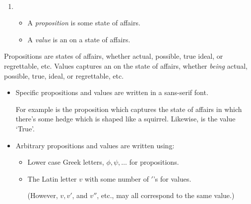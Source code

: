 \begin{note}
  \begin{definition}%
    \mbox{ }%
    \vspace{-\baselineskip}
    \begin{enumerate}[noitemsep, label=]
    \item
      \begin{itemize}[noitemsep]
      \item
        A \emph{proposition} is some state of affairs.
      \item
        A \emph{value} is an \agpe{} on a state of affairs.
      \end{itemize}
    \end{enumerate}
    \vspace{-\baselineskip}
  \end{definition}

  Propositions are states of affairs, whether actual, possible, true ideal, or regrettable, etc.
  Values captures an \agpe{} on the state of affairs, whether \emph{being} actual, possible, true, ideal, or regrettable, etc.

  \begin{notation}%
    \vspace{-\baselineskip}
    \begin{itemize}[leftmargin=*]
    \item
      Specific propositions and values are written in a \textsf{sans-serif} font.

      For example  is the proposition which captures the state of affairs in which there's some hedge which is shaped like a squirrel.
      Likewise,  is the value `True'.
    \item
      Arbitrary propositions and values are written using:
      \begin{itemize}[noitemsep]
      \item
        Lower case Greek letters, \(\phi, \psi, \dots\) for propositions.
      \item
        The Latin letter \(v\) with some number of \('\)'s for values.

        (However, \(v, v'\), and \(v''\), etc., may all correspond to the same value.)
      \end{itemize}
    \end{itemize}
    \vspace{-\baselineskip}
  \end{notation}



\end{note}
